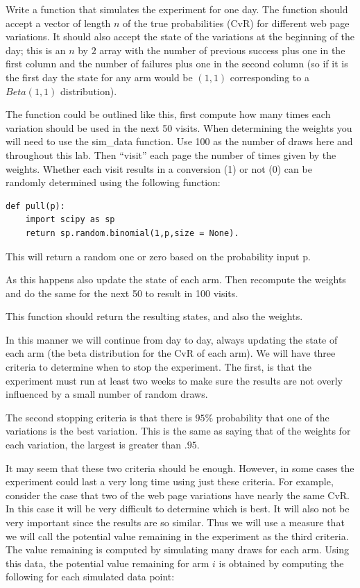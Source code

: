 \begin{problem}
Write a function that simulates the experiment for one day.  The function should accept a vector of length $n$ of the true probabilities (CvR) for different web page variations.  It should also accept the state of the variations at the beginning of the day; this is an $n$ by $2$ array with the number of previous success plus one in the first column and the number of failures plus one in the second column (so if it is the first day the state for any arm would be $(1,1)$ corresponding to a $Beta(1,1)$ distribution).

The function could be outlined like this, first compute how many times each variation should be used in the next 50 visits.  When determining the weights you will need to use the sim\_data function.  Use 100 as the number of draws here and throughout this lab.  Then ``visit'' each page the number of times given by the weights.  Whether each visit results in a conversion (1) or not (0) can be randomly determined using the following function:

\begin{lstlisting}[style = python]
def pull(p):
    import scipy as sp
    return sp.random.binomial(1,p,size = None).
\end{lstlisting}
This will return a random one or zero based on the probability input p.

As this happens also update the state of each arm.  Then recompute the weights and do the same for the next 50 to result in 100 visits.

This function should return the resulting states, and also the weights.
\end{problem}

In this manner we will continue from day to day, always updating the state of each arm (the beta distribution for the CvR of each arm).  We will have three criteria to determine when to stop the experiment.  The first, is that the experiment must run at least two weeks to make sure the results are not overly influenced by a small number of random draws.

The second stopping criteria is that there is $95\%$ probability that one of the variations is the best variation.  This is the same as saying that of the weights for each variation, the largest is greater than $.95$.

It may seem that these two criteria should be enough.  However, in some cases the experiment could last a very long time using just these criteria.  For example, consider the case that two of the web page variations have nearly the same CvR.  In this case it will be very difficult to determine which is best.  It will also not be very important since the results are so similar.  Thus we will use a measure that we will call the potential value remaining in the experiment as the third criteria.  The value remaining is computed by simulating many draws for each arm.  Using this data, the potential value remaining for arm $i$ is obtained by computing the following for each simulated data point:

